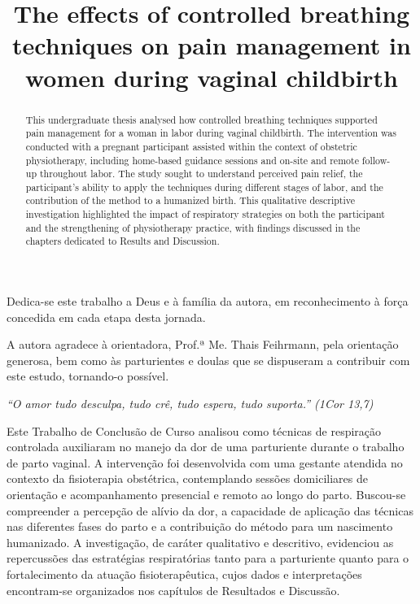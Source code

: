 \documentclass[openright]{tex/estilos/normas-utf-tex}
\title{The effects of controlled breathing techniques on pain management in women during vaginal childbirth}
\begin{document}
\pdfstringdefDisableCommands{%
        \let\MakeUppercase\relax
}
\capa
\folhaderosto

\begin{dedicatoria}
\vspace*{\fill}
Dedica-se este trabalho a Deus e à família da autora, em reconhecimento à força concedida em cada etapa desta jornada.\\[1ex]
\vspace*{\fill}
\end{dedicatoria}

\begin{agradecimentos}
A autora agradece à orientadora, Prof.ª Me. Thais Feihrmann, pela orientação generosa, bem como às parturientes e doulas que se dispuseram a contribuir com este estudo, tornando-o possível.
\end{agradecimentos}

\begin{epigrafe}
\begin{flushright}
\emph{``O amor tudo desculpa, tudo crê, tudo espera, tudo suporta.'' (1Cor 13,7)}
\end{flushright}
\end{epigrafe}

\begin{resumo}
Este Trabalho de Conclusão de Curso analisou como técnicas de respiração controlada auxiliaram no manejo da dor de uma parturiente durante o trabalho de parto vaginal. A intervenção foi desenvolvida com uma gestante atendida no contexto da fisioterapia obstétrica, contemplando sessões domiciliares de orientação e acompanhamento presencial e remoto ao longo do parto. Buscou-se compreender a percepção de alívio da dor, a capacidade de aplicação das técnicas nas diferentes fases do parto e a contribuição do método para um nascimento humanizado. A investigação, de caráter qualitativo e descritivo, evidenciou as repercussões das estratégias respiratórias tanto para a parturiente quanto para o fortalecimento da atuação fisioterapêutica, cujos dados e interpretações encontram-se organizados nos capítulos de Resultados e Discussão.
\end{resumo}

\begin{abstract}
This undergraduate thesis analysed how controlled breathing techniques supported pain management for a woman in labor during vaginal childbirth. The intervention was conducted with a pregnant participant assisted within the context of obstetric physiotherapy, including home-based guidance sessions and on-site and remote follow-up throughout labor. The study sought to understand perceived pain relief, the participant's ability to apply the techniques during different stages of labor, and the contribution of the method to a humanized birth. This qualitative descriptive investigation highlighted the impact of respiratory strategies on both the participant and the strengthening of physiotherapy practice, with findings discussed in the chapters dedicated to Results and Discussion.
\end{abstract}
\end{document}
